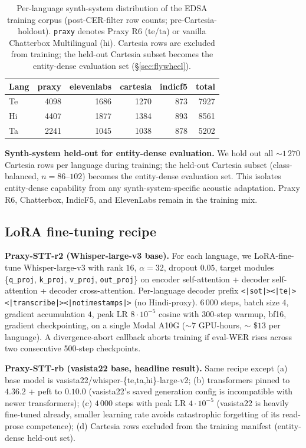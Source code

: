 \documentclass[conference,a4paper]{IEEEtran}
\begin{document}
\begin{table}[t]
\centering
\caption{Per-language synth-system distribution of the EDSA training corpus (post-CER-filter row counts; pre-Cartesia-holdout). \texttt{praxy} denotes Praxy R6 (te/ta) or vanilla Chatterbox Multilingual (hi). Cartesia rows are excluded from training; the held-out Cartesia subset becomes the entity-dense evaluation set (\S\ref{sec:flywheel}).}
\label{tab:synth_distribution}
\begin{tabular}{lrrrrr}
\toprule
Lang & praxy & elevenlabs & cartesia & indicf5 & total \\
\midrule
Te & 4098 & 1686 & 1270 & 873 & 7927 \\
Hi & 4407 & 1877 & 1384 & 893 & 8561 \\
Ta & 2241 & 1045 & 1038 & 878 & 5202 \\
\bottomrule
\end{tabular}
\end{table}

\textbf{Synth-system held-out for entity-dense evaluation.} We hold out all $\sim 1\,270$ Cartesia rows per language during training; the held-out Cartesia subset (class-balanced, $n=86$--$102$) becomes the entity-dense evaluation set. This isolates entity-dense capability from any synth-system-specific acoustic adaptation. Praxy R6, Chatterbox, IndicF5, and ElevenLabs remain in the training mix.

\subsection{LoRA fine-tuning recipe}\label{sec:lora}

\sloppy
\textbf{Praxy-STT-r2 (Whisper-large-v3 base).} For each language, we LoRA-fine-tune Whisper-large-v3 with rank $16$, $\alpha = 32$, dropout $0.05$, target modules \{\texttt{q\_proj}, \texttt{k\_proj}, \texttt{v\_proj}, \texttt{out\_proj}\} on encoder self-attention + decoder self-attention + decoder cross-attention. Per-language decoder prefix \texttt{<|sot|><|te|><|transcribe|><|notimestamps|>} (no Hindi-proxy). $6\,000$ steps, batch size $4$, gradient accumulation $4$, peak LR $8 \cdot 10^{-5}$ cosine with $300$-step warmup, bf16, gradient checkpointing, on a single Modal A10G ($\sim 7$ GPU-hours, $\sim$ \$$13$ per language). A divergence-abort callback aborts training if eval-WER rises across two consecutive 500-step checkpoints.

\textbf{Praxy-STT-rb (vasista22 base, headline result).} Same recipe except (a) base model is vasista22/whisper-\{te,ta,hi\}-large-v2; (b) transformers pinned to $4.36.2$ + peft to $0.10.0$ (vasista22's saved generation config is incompatible with newer transformers); (c) $4\,000$ steps with peak LR $4 \cdot 10^{-5}$ (vasista22 is heavily fine-tuned already, smaller learning rate avoids catastrophic forgetting of its read-prose competence); (d) Cartesia rows excluded from the training manifest (entity-dense held-out set).
\end{document}
